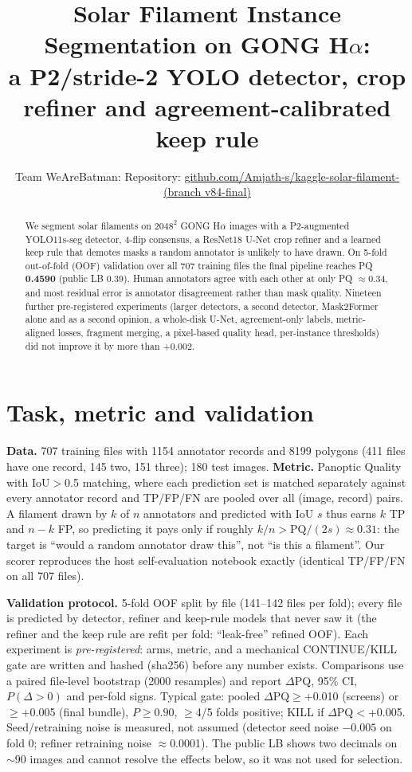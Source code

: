 \documentclass[10pt,twocolumn]{article}
\title{\vspace{-1.2cm}Solar Filament Instance Segmentation on GONG H$\alpha$:\\
a P2/stride-2 YOLO detector, crop refiner and agreement-calibrated keep rule}
\author{Team WeAreBatman: \todo{author names} \quad Repository:
\href{https://github.com/Amjath-s/kaggle-solar-filament-/tree/v84-final}{github.com/Amjath-s/kaggle-solar-filament- (branch v84-final)}}
\date{\vspace{-0.9cm}}
\newcommand{\dpq}{$\Delta$PQ}
\begin{document}
\maketitle

\begin{abstract}
We segment solar filaments on $2048^2$ GONG H$\alpha$ images with a P2-augmented YOLO11s-seg detector,
4-flip consensus, a ResNet18 U-Net crop refiner and a learned keep rule that demotes masks a random
annotator is unlikely to have drawn. On 5-fold out-of-fold (OOF) validation over all 707 training files the
final pipeline reaches PQ \textbf{0.4590} (public LB 0.39). Human annotators agree with each other at only PQ
$\approx$0.34, and most residual error is annotator disagreement rather than mask quality. Nineteen further
pre-registered experiments (larger detectors, a second detector, Mask2Former alone and as a second opinion, a
whole-disk U-Net, agreement-only labels,
metric-aligned losses, fragment merging, a pixel-based quality head, per-instance thresholds) did not improve it
by more than +0.002.
\end{abstract}

\section{Task, metric and validation}
\textbf{Data.} 707 training files with 1154 annotator records and 8199 polygons (411 files have one record,
145 two, 151 three); 180 test images. \textbf{Metric.} Panoptic Quality with IoU$>$0.5 matching, where each
prediction set is matched separately against every annotator record and TP/FP/FN are pooled over all
(image, record) pairs. A filament drawn by $k$ of $n$ annotators and predicted with IoU $s$ thus earns
$k$ TP and $n-k$ FP, so predicting it pays only if roughly $k/n > \mathrm{PQ}/(2s)\approx0.31$: the target is
``would a random annotator draw this'', not ``is this a filament''. Our scorer reproduces the host
self-evaluation notebook exactly (identical TP/FP/FN on all 707 files).

\textbf{Validation protocol.} 5-fold OOF split by file (141--142 files per fold); every file is predicted by
detector, refiner and keep-rule models that never saw it (the refiner and the keep rule are refit per fold:
``leak-free'' refined OOF). Each experiment is \emph{pre-registered}: arms, metric, and a mechanical
CONTINUE/KILL gate are written and hashed (sha256) before any number exists. Comparisons use a paired
file-level bootstrap (2000 resamples) and report \dpq, 95\% CI, $P(\Delta>0)$ and per-fold signs. Typical gate:
pooled \dpq$\ge$+0.010 (screens) or $\ge$+0.005 (final bundle), $P\ge0.90$, $\ge$4/5 folds positive; KILL if
\dpq$<$+0.005. Seed/retraining noise is measured, not assumed (detector seed noise $-0.005$ on fold 0;
refiner retraining noise $\approx$0.0001). The public LB shows two decimals on $\sim$90 images and cannot
resolve the effects below, so it was not used for selection.
\end{document}
